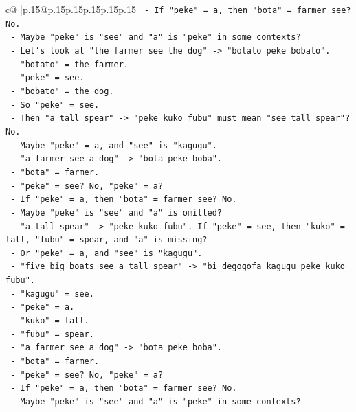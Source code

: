 \documentclass{article}
\begin{document}
{\begin{supertabular}{c@{$\;$}|p{.15\linewidth}@{}p{.15\linewidth}p{.15\linewidth}p{.15\linewidth}p{.15\linewidth}p{.15\linewidth}}
{{{\texttt{        {-} If "peke" = a, then "bota" = farmer see? No.} \\
\texttt{        {-} Maybe "peke" is "see" and "a" is "peke" in some contexts?} \\
\texttt{        {-} Let's look at "the farmer see the dog" {-}> "botato peke bobato".} \\
\texttt{        {-} "botato" = the farmer.} \\
\texttt{        {-} "peke" = see.} \\
\texttt{        {-} "bobato" = the dog.} \\
\texttt{        {-} So "peke" = see.} \\
\texttt{        {-} Then "a tall spear" {-}> "peke kuko fubu" must mean "see tall spear"? No.} \\
\texttt{        {-} Maybe "peke" = a, and "see" is "kagugu".} \\
\texttt{        {-} "a farmer see a dog" {-}> "bota peke boba".} \\
\texttt{        {-} "bota" = farmer.} \\
\texttt{        {-} "peke" = see? No, "peke" = a?} \\
\texttt{        {-} If "peke" = a, then "bota" = farmer see? No.} \\
\texttt{        {-} Maybe "peke" is "see" and "a" is omitted?} \\
\texttt{        {-} "a tall spear" {-}> "peke kuko fubu". If "peke" = see, then "kuko" = tall, "fubu" = spear, and "a" is missing?} \\
\texttt{        {-} Or "peke" = a, and "see" is "kagugu".} \\
\texttt{        {-} "five big boats see a tall spear" {-}> "bi degogofa kagugu peke kuko fubu".} \\
\texttt{        {-} "kagugu" = see.} \\
\texttt{        {-} "peke" = a.} \\
\texttt{        {-} "kuko" = tall.} \\
\texttt{        {-} "fubu" = spear.} \\
\texttt{        {-} "a farmer see a dog" {-}> "bota peke boba".} \\
\texttt{        {-} "bota" = farmer.} \\
\texttt{        {-} "peke" = see? No, "peke" = a?} \\
\texttt{        {-} If "peke" = a, then "bota" = farmer see? No.} \\
\texttt{        {-} Maybe "peke" is "see" and "a" is "peke" in some contexts?} \\
}}}
\end{supertabular}}
\end{document}
